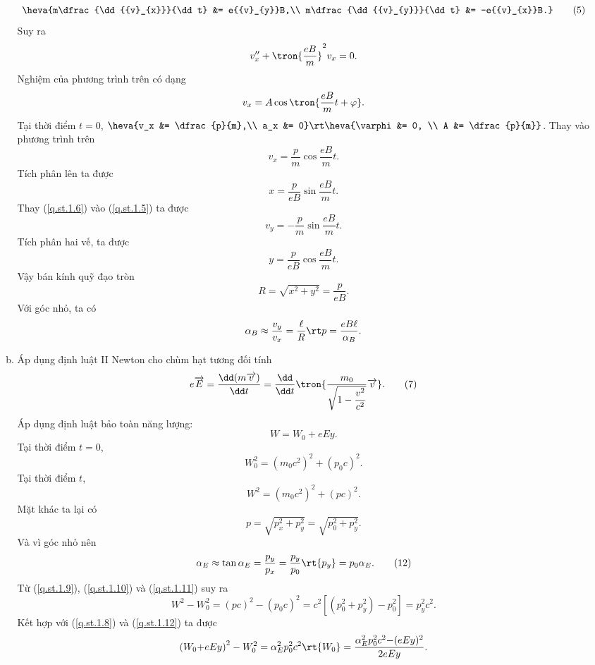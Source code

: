 \begin{loigiai}
\begin{enumerate}[1)]
\begin{enumerate}[a)]
\[\heva{m\dfrac{\dd {{v}_{x}}}{\dd t} &= e{{v}_{y}}B,\\  m\dfrac{\dd {{v}_{y}}}{\dd t} &= -e{{v}_{x}}B.} \tag{5}\label{q.st.1.5}\]
Suy ra 
\[v_x'' + \tron{\dfrac{eB}{m}}^2 v_x = 0.\]
Nghiệm của phương trình trên có dạng 
\[{{v}_{x}} = A \cos \tron{\dfrac{eB}{m}t + \varphi}.\]
Tại thời điểm $t = 0$, $\heva{v_x &= \dfrac{p}{m},\\ a_x &= 0} \rt \heva{\varphi &= 0, \\ A &= \dfrac{p}{m}}$. Thay vào phương trình trên
\[v_x = \dfrac{p}{m} \cos \dfrac{eB}{m}t. \tag{6}\label{q.st.1.6}\]
Tích phân lên ta được  
\[x = \dfrac{p}{eB}\sin \dfrac{eB}{m}t.\]	
Thay (\ref{q.st.1.6}) vào (\ref{q.st.1.5}) ta được 
\[{{v}_{y}} = -\dfrac{p}{m}\sin \dfrac{eB}{m}t.\] 	
Tích phân hai vế, ta được
\[y = \dfrac{p}{eB}\cos\dfrac{eB}{m}t.\]
Vậy bán kính quỹ đạo tròn \[R=\sqrt{{{x}^{2}}+{{y}^{2}}}=\dfrac{p}{eB}.\]
Với góc nhỏ, ta có 
\[{{\alpha}_{B}}\approx \dfrac{v_y}{v_x} = \dfrac{\ell}{R}\rt  p = \dfrac{eB\ell}{{{\alpha}_{B}}}.\]
    \item Áp dụng định luật II Newton cho chùm hạt tương đối tính
    \[e\overrightarrow{E} = \dfrac{\dd(m\overrightarrow{v})}{\dd t} = \dfrac{\dd }{\dd t}\tron{\dfrac{{{m}_{0}}}{\sqrt{1-{{\dfrac{v^2}{c^2}}}}}\overrightarrow{v}}. \tag{7}\label{q.st.1.7}\]
Áp dụng định luật bảo toàn năng lượng:
\[W = W_0 + eEy.  \tag{8}\label{q.st.1.8}\] 	
Tại thời điểm $t=0$, \[{W}_{0}^{2}={{({{m}_{0}}{{c}^{2}})}^{2}}+{{({{p}_{0}}c)}^{2}}.\tag{9}\label{q.st.1.9}\]  
Tại thời điểm $t$, 
\[{{{W}}^{2}}={{({{m}_{0}}{{c}^{2}})}^{2}}+{{(pc)}^{2}}. \tag{10}\label{q.st.1.10}\] 		
Mặt khác ta lại có 
\[ p = \sqrt{p_{x}^{2} + p_{y}^{2}} = \sqrt{p_{0}^{2} + p_{y}^{2}}.\tag{11}\label{q.st.1.11}\]		
Và vì góc nhỏ nên 
\[{{\alpha}_{E}}\approx \tan {{\alpha }_{E}} = \dfrac{{{p}_{y}}}{{{p}_{x}}} = \dfrac{{{p}_{y}}}{{{p}_{0}}}\rt {{p}_{y}} = {{p}_{0}}{{\alpha }_{E}}. \tag{12}\label{q.st.1.12}\]
Từ (\ref{q.st.1.9}), (\ref{q.st.1.10}) và (\ref{q.st.1.11}) suy ra 
\[{{{W}}^{2}}-{W}_{0}^{2}={{(pc)}^{2}} - {{({{p}_{0}}c)}^{2}}={{c}^{2}}\left[ (p_{0}^{2}+p_{y}^{2})-p_{0}^{2} \right] = p_{y}^{2}{{c}^{2}}.\]
Kết hợp với (\ref{q.st.1.8}) và (\ref{q.st.1.12}) ta được
\[{{({W_{0}}{+eE}y)}^{2}} - {W}_{0}^{2} = \alpha _{E}^{2}p_{0}^{2}{{c}^{2}}\rt {{{W}}_{0}} = \dfrac{\alpha _{E}^{2}p_{0}^{2}{{c}^{2}}{-(eE}y)^{2}}{2eEy}.\]

    \end{enumerate}
\end{enumerate}
\end{loigiai}


